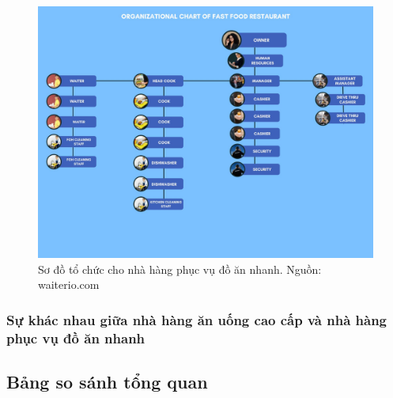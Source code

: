 \begin{figure}[H]
    \centering
    \includegraphics[width=15cm]{Images/fast-food-org-chart.jpg}
    \vspace{0.5cm}
    \caption{Sơ đồ tổ chức cho nhà hàng phục vụ đồ ăn nhanh. Nguồn: waiterio.com}
\end{figure}


\subsubsection{Sự khác nhau giữa nhà hàng ăn uống cao cấp và nhà hàng phục vụ đồ ăn nhanh}




\subsection*{Bảng so sánh tổng quan}

